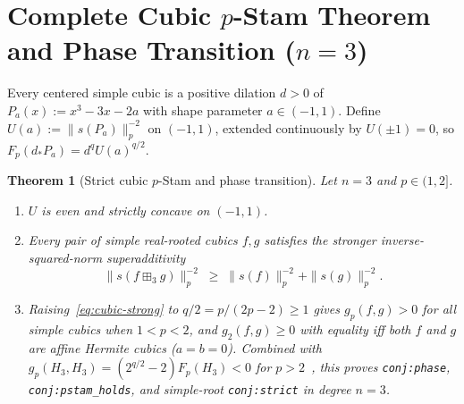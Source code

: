 \documentclass[11pt]{article}
\theoremstyle{plain}
\newtheorem{theorem}{Theorem}
\theoremstyle{definition}
\theoremstyle{remark}
\begin{document}
\section{Complete Cubic \texorpdfstring{$p$-Stam}{p-Stam} Theorem and Phase Transition (\texorpdfstring{$n = 3$}{n = 3})}

Every centered simple cubic is a positive dilation $d > 0$ of $P_a(x) := x^3 - 3x - 2a$ with shape parameter $a \in (-1,1)$. Define $U(a) := \|s(P_a)\|_p^{-2}$ on $(-1,1)$, extended continuously by $U(\pm 1) = 0$, so $F_p(d_* P_a) = d^q U(a)^{q/2}$.

\begin{theorem}[Strict cubic $p$-Stam and phase transition]\label{thm:cubic}
Let $n = 3$ and $p \in (1, 2]$.
\begin{enumerate}[label=\textup{(\arabic*)}]
\item $U$ is even and strictly concave on $(-1,1)$.
\item Every pair of simple real-rooted cubics $f, g$ satisfies the stronger inverse-squared-norm superadditivity
\begin{equation}\label{eq:cubic-strong}
\|s(f \boxplus_3 g)\|_p^{-2} \;\ge\; \|s(f)\|_p^{-2} + \|s(g)\|_p^{-2}.
\end{equation}
\item Raising~\eqref{eq:cubic-strong} to $q/2 = p/(2p-2) \ge 1$ gives $g_p(f,g) > 0$ for all simple cubics when $1 < p < 2$, and $g_2(f,g) \ge 0$ with equality iff both $f$ and $g$ are affine Hermite cubics ($a = b = 0$). Combined with $g_p(H_3, H_3) = (2^{q/2} - 2) F_p(H_3) < 0$ for $p > 2$~\cite{Hashemi2026}, this proves \texttt{conj:phase}, \texttt{conj:pstam\_holds}, and simple-root \texttt{conj:strict} in degree $n = 3$.
\end{enumerate}
\end{theorem}
\end{document}
